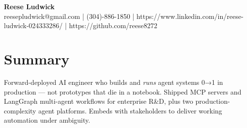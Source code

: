 \documentclass[10pt]{article}
\begin{document}
\begin{center}
{\fontsize{14}{16}\selectfont\bfseries Reese Ludwick}\\[1pt]
{\fontsize{9}{11}\selectfont reesepludwick@gmail.com | (304)-886-1850 | https://www.linkedin.com/in/reese-ludwick-024333286/ | https://github.com/reese8272}
\end{center}
\vspace{-2pt}
\section*{Summary}
\noindent Forward-deployed AI engineer who builds and \textit{runs} agent systems 0→1 in production — not prototypes that die in a notebook. Shipped MCP servers and LangGraph multi-agent workflows for enterprise R\&D, plus two production-complexity agent platforms. Embeds with stakeholders to deliver working automation under ambiguity.\par
\end{document}
